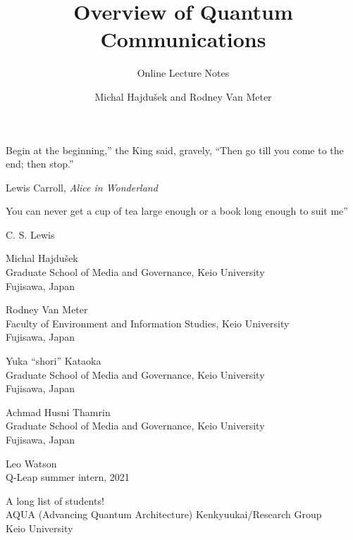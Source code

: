 \documentclass[6x9]{newmath}
\title{Overview of Quantum Communications}
\subtitle{Online Lecture Notes}
\author{Michal Hajdu\v{s}ek and Rodney Van Meter}
\begin{document}
\halftitlepage


\titlepage

\begin{copyrightpage}
\doclicenseThis%

\end{copyrightpage}

\dedication{I'd like to thank the Academy...} 

\begin{epigraphpage}
\epigraph{Begin at the beginning,'' the King said, gravely, ``Then
go till you come to the end; then stop.''}{Lewis Carroll, {\it Alice
in Wonderland}}

\epigraph{You can never get a cup of tea large enough or a book long enough to
suit me''}{C. S. Lewis}
\end{epigraphpage}

\tableofcontents
\listoffigures

\begin{contributors}[twocolumn]

\contrib 
Michal Hajdu\v{s}ek\\
Graduate School of Media and Governance, Keio University\\
Fujisawa, Japan

\contrib 
Rodney Van Meter\\
Faculty of Environment and Information Studies, Keio University\\
Fujisawa, Japan

\contrib
Yuka ``shori'' Kataoka\\
Graduate School of Media and Governance, Keio University\\
Fujisawa, Japan

\contrib
Achmad Husni Thamrin\\
Graduate School of Media and Governance, Keio University\\
Fujisawa, Japan

\contrib
Leo Watson\\
Q-Leap summer intern, 2021

\contrib 
A long list of students!\\
AQUA (Advancing Quantum Architecture) Kenkyuukai/Research Group\\
Keio University
\end{contributors}
\end{document}
